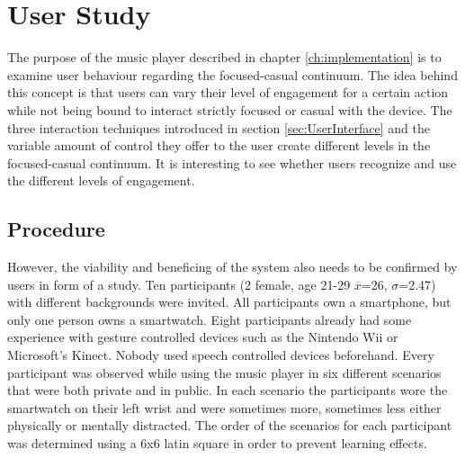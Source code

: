 \chapter{User Study}\label{ch:userStudy}









The purpose of the music player described in chapter \ref{ch:implementation} is to examine user behaviour regarding the focused-casual continuum. The idea behind this concept is that users can vary their level of engagement for a certain action while not being bound to interact strictly focused or casual with the device. The three interaction techniques introduced in section \ref{sec:UserInterface} and the variable amount of control they offer to the user create different levels in the focused-casual continuum. It is interesting to see whether users recognize and use the different levels of engagement. \\

\section{Procedure}\label{sec:studyProcedure}
However, the viability and beneficing of the system also needs to be confirmed by users in form of a study. Ten participants (2 female, age 21-29 $\overline{x}$=26, $\sigma$=2.47) with different backgrounds were invited. All participants own a smartphone, but only one person owns a smartwatch. Eight participants already had some experience with gesture controlled devices such as the Nintendo Wii or Microsoft's Kinect. Nobody used speech controlled devices beforehand. Every participant was observed while using the music player in six different scenarios that were both private and in public. In each scenario the participants wore the smartwatch on their left wrist and were sometimes more, sometimes less either physically or mentally distracted. The order of the scenarios for each participant was determined using a 6x6 latin square in order to prevent learning effects. \\

